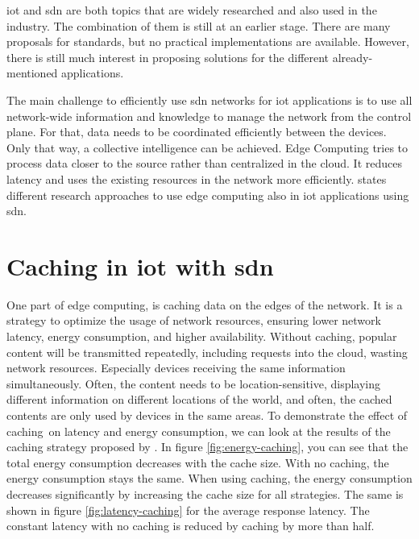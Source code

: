 \documentclass[conference]{IEEEtran}
\begin{document}
	\ac{iot} and \ac{sdn} are both topics that are widely researched and also used in the industry. The combination of them is still at an earlier stage. There are many proposals for standards, but no practical implementations are available. However, there is still much interest in proposing solutions for the different already-mentioned applications. \cite{Manguri2022-vp} 
	
	The main challenge to efficiently use \ac{sdn} networks for \ac{iot} applications is to use all network-wide information and knowledge to manage the network from the control plane. For that, data needs to be coordinated efficiently between the devices. Only that way, a collective intelligence can be achieved. Edge Computing tries to process data closer to the source rather than centralized in the cloud. It reduces latency and uses the existing resources in the network more efficiently. \cite{edge-computing} \citeauthor{Li2020-lx} states different research approaches to use edge computing also in \ac{iot} applications using \ac{sdn}. 

	\section{Caching in \ac{iot} with \ac{sdn}}
	\label{sec:caching}

	One part of edge computing, is caching data on the edges of the network. It is a strategy to optimize the usage of network resources, ensuring lower network latency, energy consumption, and higher availability. \cite{caching-1} \cite{caching-2} \cite{caching-4} Without caching, popular content will be transmitted repeatedly, including requests into the cloud, wasting network resources. Especially devices receiving the same information simultaneously. Often, the content needs to be location-sensitive, displaying different information on different locations of the world, and often, the cached contents are only used by devices in the same areas. To demonstrate the effect of caching on latency and energy consumption, we can look at the results of the caching strategy proposed by \cite{caching-1}. In figure \ref{fig:energy-caching}, you can see that the total energy consumption decreases with the cache size. With no caching, the energy consumption stays the same. When using caching, the energy consumption decreases significantly by increasing the cache size for all strategies. The same is shown in figure \ref{fig:latency-caching} for the average response latency. The constant latency with no caching is reduced by caching by more than half.
\end{document}
